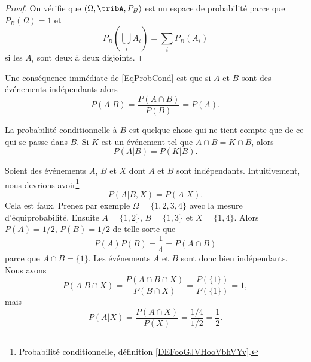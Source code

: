 \begin{proof}
	On vérifie que \( (\Omega,\tribA,P_B)\) est un espace de probabilité parce que \( P_B(\Omega)=1\) et
	\begin{equation}
		P_B(\bigcup_iA_i)=\sum_iP_B(A_i)
	\end{equation}
	si les \( A_i\) sont deux à deux disjoints.
\end{proof}

Une conséquence immédiate de \eqref{EqProbCond} est que si \( A\) et \( B\) sont des événements indépendants alors
\begin{equation}
	P(A|B)=\frac{ P(A\cap B) }{ P(B) }=P(A).
\end{equation}

La probabilité conditionnelle à \( B\) est quelque chose qui ne tient compte que de ce qui se passe dans \( B\). Si \( K\) est un événement tel que \( A\cap B=K\cap B\), alors
\begin{equation}    \label{EqOVHCWom}
	P(A|B)=P(K|B).
\end{equation}


\begin{example}       \label{EXooIAYTooFjFTrT}
    Soient des événements \( A\), \( B\) et \( X\) dont \( A\) et \( B\) sont indépendants. Intuitivement, nous devrions avoir\footnote{Probabilité conditionnelle, définition \ref{DEFooGJVHooVbhVYv}.}
    \begin{equation}
        P(A|B,X)=P(A|X).
    \end{equation}
    Cela est faux. Prenez par exemple \( \Omega=\{ 1,2,3,4 \}\) avec la mesure d'équiprobabilité. Ensuite \( A=\{ 1,2 \}\), \( B=\{ 1,3 \}\) et \( X=\{ 1,4 \}\). Alors \( P(A)=1/2\), \( P(B)=1/2\) de telle sorte que
    \begin{equation}
        P(A)P(B)=\frac{1}{ 4 }=P(A\cap B)
    \end{equation}
    parce que \( A\cap B=\{ 1 \}\). Les événements \( A\) et \( B\) sont donc bien indépendants. Nous avons
    \begin{equation}
        P(A|B\cap X)=\frac{ P(A\cap B\cap X) }{ P(B\cap X) }=\frac{ P(\{ 1 \}) }{ P(\{ 1 \})  }=1, 
    \end{equation}
    mais
    \begin{equation}
        P(A|X)=\frac{ P(A\cap X) }{ P(X) }=\frac{ 1/4 }{ 1/2 }=\frac{1}{ 2 }.
    \end{equation}
\end{example}


